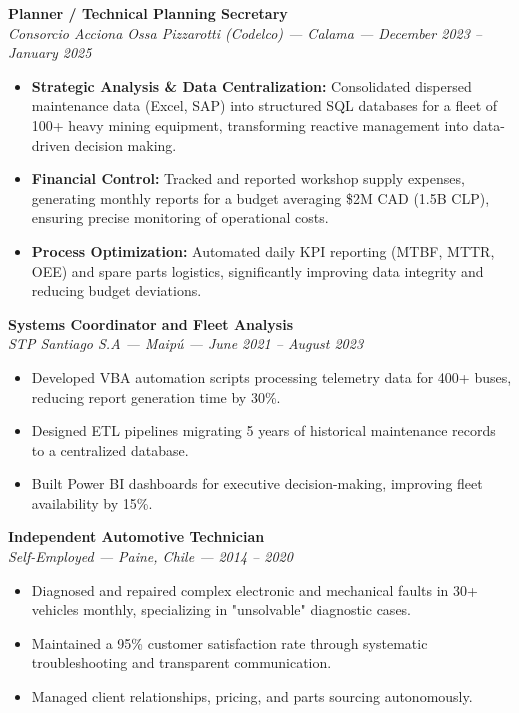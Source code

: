 \documentclass[10pt,letterpaper]{article}
\begin{document}
\vspace{0.2cm}

\noindent \textbf{Planner / Technical Planning Secretary} \\
\textit{Consorcio Acciona Ossa Pizzarotti (Codelco) — Calama — December 2023 – January 2025}
\begin{itemize}
    \item \textbf{Strategic Analysis \& Data Centralization:} Consolidated dispersed maintenance data (Excel, SAP) into structured SQL databases for a fleet of 100+ heavy mining equipment, transforming reactive management into data-driven decision making.
    \item \textbf{Financial Control:} Tracked and reported workshop supply expenses, generating monthly reports for a budget averaging \$2M CAD (1.5B CLP), ensuring precise monitoring of operational costs.
    \item \textbf{Process Optimization:} Automated daily KPI reporting (MTBF, MTTR, OEE) and spare parts logistics, significantly improving data integrity and reducing budget deviations.
\end{itemize}

\vspace{0.2cm}

\noindent \textbf{Systems Coordinator and Fleet Analysis} \\
\textit{STP Santiago S.A — Maipú — June 2021 – August 2023}
\begin{itemize}
    \item Developed VBA automation scripts processing telemetry data for 400+ buses, reducing report generation time by 30\%.
    \item Designed ETL pipelines migrating 5 years of historical maintenance records to a centralized database.
    \item Built Power BI dashboards for executive decision-making, improving fleet availability by 15\%.
\end{itemize}

\vspace{0.2cm}

\noindent \textbf{Independent Automotive Technician} \\
\textit{Self-Employed — Paine, Chile — 2014 – 2020}
\begin{itemize}
    \item Diagnosed and repaired complex electronic and mechanical faults in 30+ vehicles monthly, specializing in "unsolvable" diagnostic cases.
    \item Maintained a 95\% customer satisfaction rate through systematic troubleshooting and transparent communication.
    \item Managed client relationships, pricing, and parts sourcing autonomously.
\end{itemize}
\end{document}
